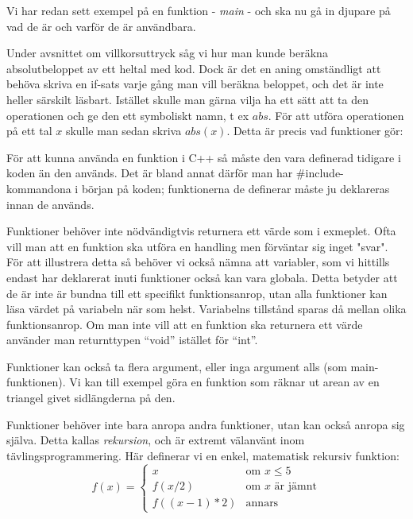 Vi har redan sett exempel på en funktion - \emph{main} - och ska nu gå in djupare på vad de är och varför de är användbara.

Under avsnittet om villkorsuttryck såg vi hur man kunde beräkna absolutbeloppet av ett heltal med kod. Dock är det en aning omständligt att behöva skriva en if-sats varje gång man vill beräkna beloppet, och det är inte heller särskilt läsbart. Istället skulle man gärna vilja ha ett sätt att ta den operationen och ge den ett symboliskt namn, t ex $abs$. För att utföra operationen på ett tal $x$ skulle man sedan skriva $abs(x)$. Detta är precis vad funktioner gör:




För att kunna använda en funktion i C++ så måste den vara definerad tidigare i koden än den används. Det är bland annat därför man har \#include-kommandona i början på koden; funktionerna de definerar måste ju deklareras innan de används.

Funktioner behöver inte nödvändigtvis returnera ett värde som i exmeplet. Ofta vill man att en funktion ska utföra en handling men förväntar sig inget "svar". För att illustrera detta så behöver vi också nämna att variabler, som vi hittills endast har deklarerat inuti funktioner också kan vara globala. Detta betyder att de är inte är bundna till ett specifikt funktionsanrop, utan alla funktioner kan läsa värdet på variabeln när som helst. Variabelns tillstånd sparas då mellan olika funktionsanrop. Om man inte vill att en funktion ska returnera ett värde använder man returnttypen ``void'' istället för ``int''.



Funktioner kan också ta flera argument, eller inga argument alls (som main-funktionen). Vi kan till exempel göra en funktion som räknar ut arean av en triangel givet sidlängderna på den.



Funktioner behöver inte bara anropa andra funktioner, utan kan också anropa sig själva. Detta kallas \emph{rekursion}, och är extremt välanvänt inom tävlingsprogrammering.   
Här definerar vi en enkel, matematisk rekursiv funktion:
$$
f(x) = 
\left\{
    \begin{array}{ll}
        x & \mbox{om } x \leq 5 \\
        f (x/2) & \mbox{om } x \mbox{ är jämnt} \\
        f ((x-1)*2) & \mbox{annars}
    \end{array}
\right.
$$

